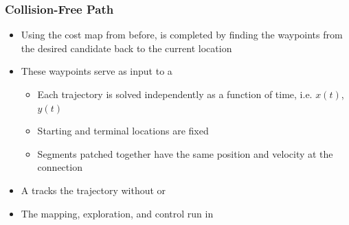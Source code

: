 \documentclass[11pt,professionalfonts,hyperref={pdftex,pdfpagemode=none,pdfstartview=FitH}]{beamer}
\renewcommand{\emph}[1]{\textit{\textbf{\color{blue}{#1}}}}
\begin{document}
\begin{frame}
\frametitle{Collision-Free Path}

\begin{itemize}
	\item Using the cost map from before, \emph{Dijkstra's algorithm} is completed by finding the waypoints from the desired candidate back to the current location
	\vspace*{0.0cm}\pause
	\item These waypoints serve as input to a \emph{constrained polynomial least squares trajectory}
	\begin{itemize}
		\item Each trajectory is solved independently as a function of time, i.e. $x(t)$, $y(t)$
		\item Starting and terminal locations are fixed
		\item Segments patched together have the same position and velocity at the connection
	\end{itemize}
	\vspace*{0.0cm}\pause
	\item A \emph{geometric controller} tracks the trajectory without \emph{singularities} or \emph{ambiguities}
	\vspace*{0.0cm}\pause
	\item The mapping, exploration, and control run in \emph{real-time}
\end{itemize}

\end{frame}


\end{document}
